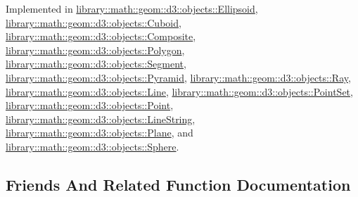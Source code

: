 Implemented in \hyperlink{classlibrary_1_1math_1_1geom_1_1d3_1_1objects_1_1_ellipsoid_af912ba3948bd06ac517c727210082df3}{library\+::math\+::geom\+::d3\+::objects\+::\+Ellipsoid}, \hyperlink{classlibrary_1_1math_1_1geom_1_1d3_1_1objects_1_1_cuboid_a82f1700cef1777e918a5363a71278e99}{library\+::math\+::geom\+::d3\+::objects\+::\+Cuboid}, \hyperlink{classlibrary_1_1math_1_1geom_1_1d3_1_1objects_1_1_composite_adf6e594a816e509f7e85d51c84255236}{library\+::math\+::geom\+::d3\+::objects\+::\+Composite}, \hyperlink{classlibrary_1_1math_1_1geom_1_1d3_1_1objects_1_1_polygon_a6d30846a912386e5e814e0bffa0a4042}{library\+::math\+::geom\+::d3\+::objects\+::\+Polygon}, \hyperlink{classlibrary_1_1math_1_1geom_1_1d3_1_1objects_1_1_segment_a2d3c1a17842ee4ee83cffda33911291d}{library\+::math\+::geom\+::d3\+::objects\+::\+Segment}, \hyperlink{classlibrary_1_1math_1_1geom_1_1d3_1_1objects_1_1_pyramid_a150cd331b3dc6e36c74b37bc6988f019}{library\+::math\+::geom\+::d3\+::objects\+::\+Pyramid}, \hyperlink{classlibrary_1_1math_1_1geom_1_1d3_1_1objects_1_1_ray_a2140183dca4c36f5c51ed9e8f2cd220d}{library\+::math\+::geom\+::d3\+::objects\+::\+Ray}, \hyperlink{classlibrary_1_1math_1_1geom_1_1d3_1_1objects_1_1_line_a6c2d2268fed2b9c461730fbcd4425d6e}{library\+::math\+::geom\+::d3\+::objects\+::\+Line}, \hyperlink{classlibrary_1_1math_1_1geom_1_1d3_1_1objects_1_1_point_set_ab1a24422b85249c21feb603025140c1a}{library\+::math\+::geom\+::d3\+::objects\+::\+Point\+Set}, \hyperlink{classlibrary_1_1math_1_1geom_1_1d3_1_1objects_1_1_point_a76847422ebfcc28388d1b0427a5cb1de}{library\+::math\+::geom\+::d3\+::objects\+::\+Point}, \hyperlink{classlibrary_1_1math_1_1geom_1_1d3_1_1objects_1_1_line_string_a289414dbfc4ff32520f546c8a435170f}{library\+::math\+::geom\+::d3\+::objects\+::\+Line\+String}, \hyperlink{classlibrary_1_1math_1_1geom_1_1d3_1_1objects_1_1_plane_a2e43e82344b57898606f5c13ffc9dcc9}{library\+::math\+::geom\+::d3\+::objects\+::\+Plane}, and \hyperlink{classlibrary_1_1math_1_1geom_1_1d3_1_1objects_1_1_sphere_adc05fd7666ae15513e6aa9ec66a1ca9b}{library\+::math\+::geom\+::d3\+::objects\+::\+Sphere}.



\subsection{Friends And Related Function Documentation}
\mbox{\label{classlibrary_1_1math_1_1geom_1_1d3_1_1_object_a418df9bf4a73078f3d494edef1743f8d}} 
